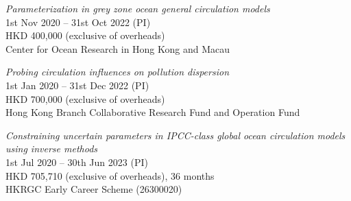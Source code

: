 \documentclass[letterpaper]{article}
\renewenvironment{itemize}{
  \begin{list}{}{
    \setlength{\leftmargin}{1.5em}
  }
}{
  \end{list}
}
\begin{document}
\begin{itemize}
\item[--] \textit{Parameterization in grey zone ocean general circulation models}\\
1st Nov 2020 -- 31st Oct 2022 (PI)\\
HKD 400,000 (exclusive of overheads)\\
Center for Ocean Research in Hong Kong and Macau

\item[--] \textit{Probing circulation influences on pollution dispersion}\\
1st Jan 2020 -- 31st Dec 2022 (PI)\\
HKD 700,000 (exclusive of overheads)\\ 
Hong Kong Branch Collaborative Research Fund and Operation Fund

\item[--] \textit{Constraining uncertain parameters in IPCC-class global ocean
circulation models using inverse methods}\\
1st Jul 2020 -- 30th Jun 2023 (PI)\\
HKD 705,710 (exclusive of overheads), 36 months \\
HKRGC Early Career Scheme (26300020)

\end{itemize}


\end{document}
